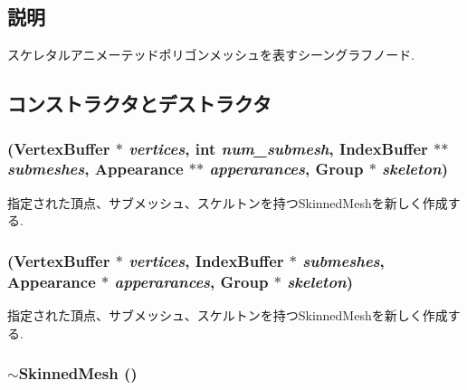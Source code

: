 \subsection{説明}
スケレタルアニメーテッドポリゴンメッシュを表すシーングラフノード. 

\subsection{コンストラクタとデストラクタ}
\hypertarget{classm3g_1_1SkinnedMesh_277419d6851b0e305f66a46095269915}{
\subsubsection[{SkinnedMesh}]{ ({\bf VertexBuffer} $\ast$ {\em vertices}, \/  int {\em num\_\-submesh}, \/  {\bf IndexBuffer} $\ast$$\ast$ {\em submeshes}, \/  {\bf Appearance} $\ast$$\ast$ {\em apperarances}, \/  {\bf Group} $\ast$ {\em skeleton})}}
\label{classm3g_1_1SkinnedMesh_277419d6851b0e305f66a46095269915}


指定された頂点、サブメッシュ、スケルトンを持つSkinnedMeshを新しく作成する. \hypertarget{classm3g_1_1SkinnedMesh_094bf88089897beeb8b8776e3bbb299d}{
\subsubsection[{SkinnedMesh}]{ ({\bf VertexBuffer} $\ast$ {\em vertices}, \/  {\bf IndexBuffer} $\ast$ {\em submeshes}, \/  {\bf Appearance} $\ast$ {\em apperarances}, \/  {\bf Group} $\ast$ {\em skeleton})}}
\label{classm3g_1_1SkinnedMesh_094bf88089897beeb8b8776e3bbb299d}


指定された頂点、サブメッシュ、スケルトンを持つSkinnedMeshを新しく作成する. \hypertarget{classm3g_1_1SkinnedMesh_c73da5b5c5f8f14fc241328b4b78928c}{
\subsubsection[{$\sim$SkinnedMesh}]{\setlength{\rightskip}{0pt plus 5cm}$\sim${\bf SkinnedMesh} ()}}
\label{classm3g_1_1SkinnedMesh_c73da5b5c5f8f14fc241328b4b78928c}


